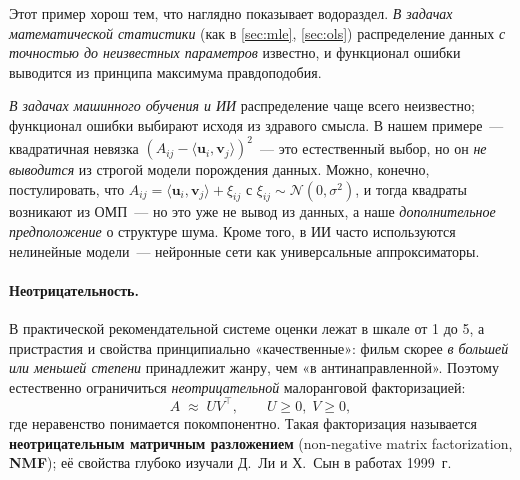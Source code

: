 \begin{notebox}[title={Различие задач математической статистики и машинного обучения}]
Этот пример хорош тем, что наглядно показывает водораздел.
\emph{В задачах математической статистики} (как в \cref{sec:mle},
\cref{sec:ols}) распределение данных \emph{с точностью до неизвестных
параметров} известно, и функционал ошибки выводится из принципа
максимума правдоподобия.

\emph{В задачах машинного обучения и ИИ} распределение чаще всего
неизвестно; функционал ошибки выбирают исходя из здравого смысла. В
нашем примере~--- квадратичная невязка $(A_{ij}-\langle\mathbf u_i,\mathbf v_j\rangle)^{2}$~---
это естественный выбор, но он \emph{не выводится} из строгой модели
порождения данных. Можно, конечно, постулировать, что
$A_{ij}=\langle\mathbf u_i,\mathbf v_j\rangle+\xi_{ij}$ с
$\xi_{ij}\sim\mathcal N(0,\sigma^{2})$, и тогда квадраты возникают
из ОМП~--- но это уже не вывод из данных, а наше \emph{дополнительное
предположение} о структуре шума. Кроме того, в ИИ часто используются
нелинейные модели~--- нейронные сети как универсальные аппроксиматоры.
\end{notebox}

\paragraph{Неотрицательность.}
В практической рекомендательной системе оценки лежат в шкале от 1 до 5,
а пристрастия и свойства принципиально «качественные»: фильм скорее
\emph{в большей или меньшей степени} принадлежит жанру, чем «в
антинаправленной». Поэтому естественно ограничиться \emph{неотрицательной}
малоранговой факторизацией:
\begin{equation}\label{eq:nmf}
A\;\approx\;UV^{\top},\qquad U\geq 0,\;V\geq 0,
\end{equation}
где неравенство понимается покомпонентно. Такая факторизация
называется \textbf{неотрицательным матричным разложением}
(non-negative matrix factorization, \textbf{NMF}); её свойства глубоко
изучали Д.~Ли и Х.~Сын в работах 1999~г.

